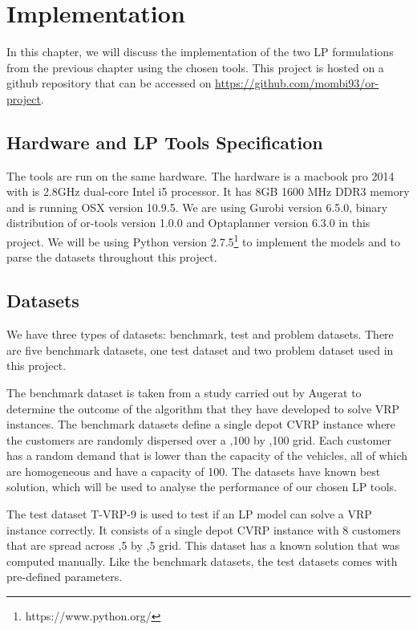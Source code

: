 \chapter{Implementation}
In this chapter, we will discuss the implementation
of the two LP formulations from the previous chapter using the chosen tools.
This project is hosted on a github repository that can be accessed on \url{https://github.com/mombi93/or-project}.

\section{Hardware and LP Tools Specification}
The tools are run on the same hardware. The hardware is a macbook pro 2014 with is 2.8GHz dual-core Intel i5 processor. It has
8GB 1600 MHz DDR3 memory and is running OSX version 10.9.5. We are using Gurobi version 6.5.0, binary distribution of or-tools version 1.0.0
and Optaplanner version 6.3.0 in this project. We will be using Python version 2.7.5\footnote{https://www.python.org/}
 to implement the models and to parse the datasets throughout this project.

\section{Datasets}
We have three types of datasets: benchmark, test and problem datasets. There are five benchmark datasets, one test dataset and two problem dataset used in this project.

The benchmark dataset is taken from a study carried out
by Augerat \cite{Augerat1998} to determine the outcome of the algorithm that they have developed to solve VRP instances.
The benchmark datasets define a single depot CVRP instance where the customers are randomly dispersed over a ,100\rbrack \hspace{0.025cm} by ,100\rbrack \hspace{0.025cm} grid.
Each customer has a random demand that is lower than the capacity of the vehicles, all of which are homogeneous and have a capacity of 100.
The datasets have known best solution, which will be used to analyse the performance of our chosen LP tools.

The test dataset T-VRP-9 is used to test if an LP model can solve a VRP instance correctly. It consists of a single depot CVRP
instance with 8 customers that are spread across ,5\rbrack \hspace{0.025cm} by ,5\rbrack \hspace{0.025cm} grid.
This dataset has a known solution that was computed manually. Like the benchmark
datasets, the test datasets comes with pre-defined parameters.

